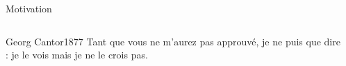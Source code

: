 \documentclass{beamer}
\begin{document}
\begin{frame}{}{Motivation}
	\begin{columns}
		\begin{column}{0.6\textwidth}
			\begin{customquote}{Georg Cantor}{1877}
				Tant que vous ne m'aurez pas approuvé, je ne puis que dire : je le vois mais je ne le crois pas.
			\end{customquote}
		\end{column}
		\begin{column}{0.5\textwidth}
			\centering
		\end{column}
	\end{columns}
\end{frame}
\end{document}

